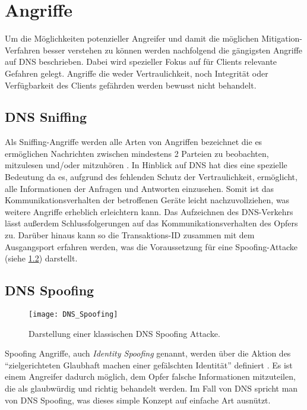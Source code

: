 \chapter{Angriffe}
\label{chap:attacks}
Um die Möglichkeiten potenzieller Angreifer und damit die möglichen Mitigation-Verfahren besser verstehen zu können werden nachfolgend die gängigsten Angriffe auf DNS beschrieben. Dabei wird spezieller Fokus auf für Clients relevante Gefahren gelegt. Angriffe die weder Vertraulichkeit, noch Integrität oder Verfügbarkeit des Clients gefährden werden bewusst nicht behandelt.

\section{DNS Sniffing}
\label{sec:attacks-dnssniffing}
Als Sniffing-Angriffe werden alle Arten von Angriffen bezeichnet die es ermöglichen Nachrichten zwischen mindestens 2 Parteien zu beobachten, mitzulesen und/oder mitzuhören \cite{CAPEC157}. In Hinblick auf DNS hat dies eine spezielle Bedeutung da es, aufgrund des fehlenden Schutz der Vertraulichkeit, ermöglicht, alle Informationen der Anfragen und Antworten einzusehen. Somit ist das Kommunikationsverhalten der betroffenen Geräte leicht nachzuvollziehen, was weitere Angriffe erheblich erleichtern kann. Das Aufzeichnen des DNS-Verkehrs lässt außerdem Schlussfolgerungen auf das Kommunikationsverhalten des Opfers zu. Darüber hinaus kann so die Transaktions-ID zusammen mit dem Ausgangsport erfahren werden, was die Voraussetzung für eine Spoofing-Attacke (siehe \ref{sec:attacks-dnsspoofing}) darstellt. 

\section{DNS Spoofing}
\label{sec:attacks-dnsspoofing}
\begin{wrapfigure}{r}{0.5\textwidth}
    \begin{center}
        \texttt{[image: DNS\_Spoofing]}
    \end{center}
    \caption{Darstellung einer klassischen DNS Spoofing Attacke.}
    \label{img:dnsspoofing}
\end{wrapfigure}

Spoofing Angriffe, auch \textit{Identity Spoofing} genannt, werden über die Aktion des ``zielgerichteten Glaubhaft machen einer gefälschten Identität'' definiert \cite{CAPEC151}. Es ist einem Angreifer dadurch möglich, dem Opfer falsche Informationen mitzuteilen, die als glaubwürdig und richtig behandelt werden. Im Fall von DNS spricht man von DNS Spoofing, was dieses simple Konzept auf einfache Art ausnützt.

